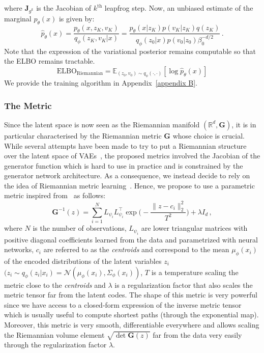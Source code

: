 \documentclass[10pt,journal,compsoc]{IEEEtran}
\begin{document}
where $\mathbf{J}_{g^k}$ is the Jacobian of $k^{\text{th}}$ leapfrog step. Now, an unbiased estimate of the marginal $p_{\theta}(x)$ is given by:
\begin{equation}\label{eq: log-like estimate rhvae}
    \hat{p}_{\theta}(x) = \frac{p_{\theta}(x, z_K, v_K)}{q_{\phi}(z_K, v_K|x)} = \frac{p_{\theta}(x|z_K)p(v_K|z_K)q(z_K)}{q_{\phi}(z_0|x)p(v_0|z_0)\beta_0^{-d/2}}\,.
\end{equation}
    Note that the expression of the variational posterior remains computable so that the ELBO remains tractable. 
\begin{equation}\label{eq: RHVAE ELBO}
    \mathrm{ELBO}_{\mathrm{Riemannian}} = \mathbb{E}_{(z_0, v_0) \sim q_{\phi}(\cdot, \cdot)}[\log \widehat{p}_{\theta}(x)]
\end{equation}
    We provide the training algorithm in Appendix~\ref{appendix B}.
    
    \subsubsection{The Metric} 
    Since the latent space is now seen as the Riemannian manifold $(\mathbb{R}^d, \mathbf{G})$, it is in particular characterised by the Riemannian metric $\mathbf{G}$ whose choice is crucial. While several attempts have been made to try to put a Riemannian structure over the latent space of VAEs~\cite{arvanitidis_latent_2018,chen_metrics_2018,shao_riemannian_2018,frenzel_latent_2019, kalatzis_variational_2020, arvanitidis_geometrically_2020}, the proposed metrics involved the Jacobian of the generator function which is hard to use in practice and is constrained by the generator network architecture. As a consequence, we instead decide to rely on the idea of Riemannian metric learning~\cite{lebanon_metric_2006}. Hence, we propose to use a parametric metric inspired from~\cite{louis_computational_2019} as follows:
    \begin{equation}\label{eq: metric}
        \mathbf{G}^{-1}(z) = \sum_{i=1}^N L_{\psi_i} L_{\psi_i}^{\top} \exp \Big(-\frac{\lVert z - c_i \rVert_2^2}{T^2} \Big) + \lambda I_d \,,
    \end{equation}
    where $N$ is the number of observations, $L_{\psi_i}$ are lower triangular matrices with positive diagonal coefficients learned from the data and parametrized with neural networks, $c_i$ are referred to as the \emph{centroids} and correspond to the mean $\mu_{\phi}(x_i)$ of the encoded distributions of the latent variables $z_i$ $(z_i \sim q_{\phi}(z_i|x_i) = \mathcal{N}(\mu_{\phi}(x_i), \Sigma_{\phi}(x_i))$, $T$ is a temperature scaling the metric close to the \emph{centroids} and $\lambda$ is a regularization factor that also scales the metric tensor far from the latent codes. The shape of this metric is very powerful since we have access to a closed-form expression of the inverse metric tensor which is usually useful to compute shortest paths (through the exponential map). Moreover, this metric is very smooth, differentiable everywhere and allows scaling the Riemannian volume element $\sqrt{\det \mathbf{G}(z)}$ far from the data very easily through the regularization factor $\lambda$.
\end{document}
